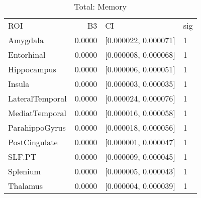 \documentclass{article}
\begin{document}
\begin{table}[H]
\centering
\caption{Total: Memory} 
\begin{tabular}{lrll}
  \toprule
ROI & B3 & CI & sig \\ 
  \rowcolor{orange!30} \midrule
Amygdala & 0.0000 & [0.000022, 0.000071] & 1 \\ 
   \rowcolor{orange!30}Entorhinal & 0.0000 & [0.000008, 0.000068] & 1 \\ 
   \rowcolor{orange!30}Hippocampus & 0.0000 & [0.000006, 0.000051] & 1 \\ 
   \rowcolor{orange!30}Insula & 0.0000 & [0.000003, 0.000035] & 1 \\ 
   \rowcolor{orange!30}LateralTemporal & 0.0000 & [0.000024, 0.000076] & 1 \\ 
   \rowcolor{orange!30}MediatTemporal & 0.0000 & [0.000016, 0.000058] & 1 \\ 
   \rowcolor{orange!30}ParahippoGyrus & 0.0000 & [0.000018, 0.000056] & 1 \\ 
   \rowcolor{orange!30}PostCingulate & 0.0000 & [0.000001, 0.000047] & 1 \\ 
   \rowcolor{orange!30}SLF.PT & 0.0000 & [0.000009, 0.000045] & 1 \\ 
   \rowcolor{orange!30}Splenium & 0.0000 & [0.000005, 0.000043] & 1 \\ 
   \rowcolor{orange!30}Thalamus & 0.0000 & [0.000004, 0.000039] & 1 \\ 
   \bottomrule
\end{tabular}
\end{table}
\end{document}
